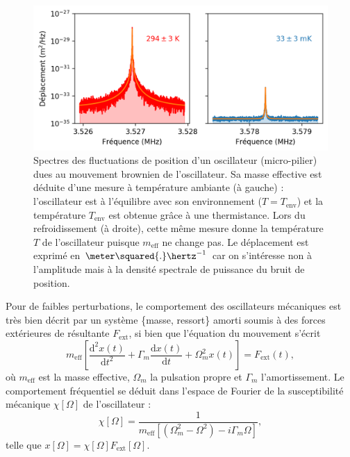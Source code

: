 \documentclass[12pt,a4paper]{article}
\renewcommand{\d}{\mathrm{d}}
\begin{document}
\begin{figure}[b!]
\center
\includegraphics[scale=0.75]{figures/thermal_peak_def_filled.png}
\caption{Spectres des fluctuations de position d'un oscillateur (micro-pilier) dues au mouvement brownien de l'oscillateur.
Sa masse effective est déduite d'une mesure à température ambiante (à gauche) : l'oscillateur est à l'équilibre avec son environnement ($T=T_\mathrm{env}$) et la température $T_\mathrm{env}$ est obtenue grâce à une thermistance.
Lors du refroidissement (à droite), cette même mesure donne la température $T$ de l'oscillateur puisque $m_\mathrm{eff}$ ne change pas. 
Le déplacement est exprimé en $\meter\squared{.}\hertz^{-1}$ car on s'intéresse non à l'amplitude mais à la densité spectrale de puissance du bruit de position.}
\label{fig:thermal_noise}
\end{figure}

Pour de faibles perturbations, le comportement des oscillateurs mécaniques est très bien décrit par un système \{masse, ressort\} amorti soumis à des forces extérieures de résultante $F_\mathrm{ext}$, si bien que l'équation du mouvement s'écrit
\begin{equation}
m_\mathrm{eff}\left[\frac{\d ^2 x(t)}{\d t^2} + \Gamma_m \frac{\d  x(t)}{\d t} +  \Omega_m^2 x(t)\right] = F_\mathrm{ext}(t),
\label{eq:eq_of_motion}
\end{equation}
où $m_\mathrm{eff}$ est la masse effective, $\Omega_m$ la pulsation propre et $\Gamma_m$ l'amortissement.
Le comportement fréquentiel se déduit dans l'espace de Fourier de la susceptibilité mécanique $\chi[\Omega]$ de l'oscillateur :
\begin{equation}
\chi[\Omega] = \frac{1}{m_\mathrm{eff}[(\Omega_m^2-\Omega^2)-i\Gamma_m\Omega]},
\end{equation}
telle que $x[\Omega] = \chi[\Omega]F_\mathrm{ext}[\Omega]$.
\end{document}
